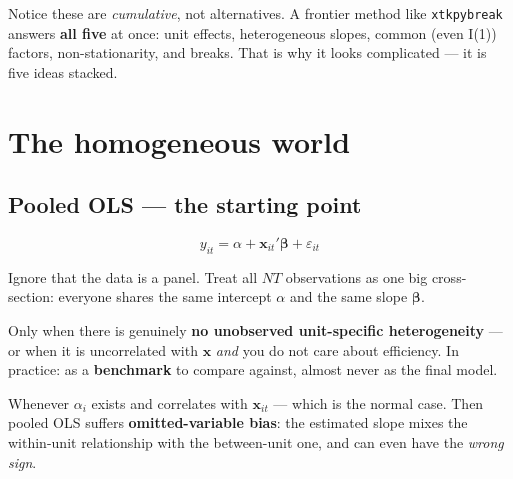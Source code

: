 \documentclass[11pt,a4paper]{article}
\newcommand{\cmd}[1]{\texttt{\textcolor{corange}{#1}}}
\newcommand{\bbeta}{\boldsymbol{\beta}}
\newcommand{\bx}{\mathbf{x}}
\newcommand{\Ito}{I(1)}
\begin{document}
\begin{begbox}
Notice these are \emph{cumulative}, not alternatives. A frontier method like \cmd{xtkpybreak}
answers \textbf{all five} at once: unit effects, heterogeneous slopes, common (even \Ito) factors,
non-stationarity, and breaks. That is why it looks complicated --- it is five ideas stacked.
\end{begbox}

\section{The homogeneous world}

\subsection{Pooled OLS --- the starting point}
\begin{eqbox}
\[ y_{it}=\alpha+\bx_{it}'\bbeta+\varepsilon_{it} \]
\end{eqbox}
\begin{idea}
Ignore that the data is a panel. Treat all $NT$ observations as one big cross-section: everyone
shares the same intercept $\alpha$ and the same slope $\bbeta$.
\end{idea}
\begin{whenbox}
Only when there is genuinely \textbf{no unobserved unit-specific heterogeneity} --- or when it is
uncorrelated with $\bx$ \emph{and} you do not care about efficiency. In practice: as a
\textbf{benchmark} to compare against, almost never as the final model.
\end{whenbox}
\begin{avoidbox}
Whenever $\alpha_i$ exists and correlates with $\bx_{it}$ --- which is the normal case. Then
pooled OLS suffers \textbf{omitted-variable bias}: the estimated slope mixes the within-unit
relationship with the between-unit one, and can even have the \emph{wrong sign}.
\end{avoidbox}
\end{document}

